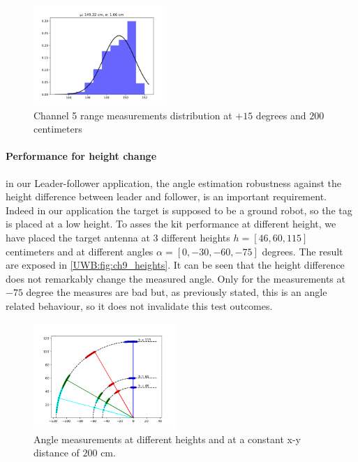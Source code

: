 \begin{figure}
    \centering
    \includegraphics[width=0.45\textwidth]{images/ch5_range_hist.png}
    \caption{Channel 5 range measurements distribution at $+15$ degrees and $200$ centimeters}
    \label{UWB:fig:Range_ch5}
\end{figure}

\paragraph{Performance for height change}
in our Leader-follower application, the angle estimation robustness against the height difference between leader and follower, is an important requirement. Indeed in our application the target is supposed to be a ground robot, so the tag is placed at a low height. To asses the kit performance at different height, we have placed the target antenna at 3 different heights $h=[46,60,115]$ centimeters and at different angles $\alpha = [0,-30,-60,-75]$ degrees. The result are exposed in \autoref{UWB:fig:ch9_heights}. It can be seen that the height difference does not remarkably change the measured angle. Only for the measurements at $-75$ degree the measures are bad but, as previously stated, this is an angle related behaviour, so it does not invalidate this test outcomes.\\

\begin{figure}
    \centering
    \includegraphics[width=0.48\textwidth]{images/ch9_heights.png}
    \caption{Angle measurements at different heights and at a constant x-y distance of $200$ cm.}
    \label{UWB:fig:ch9_heights}
\end{figure}

